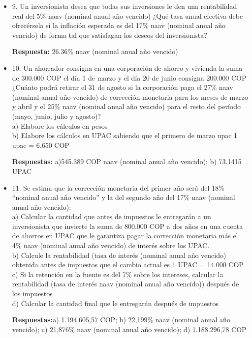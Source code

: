 \begin{itemize}
 \item 9. Un inversionista desea que todas sus inversiones le den una rentabilidad real del 5\% naav (nominal anual año vencido) ¿Qué  tasa anual efectiva debe ofrecérsela si la inflación esperada es del 17\% naav (nominal anual año vencido) de forma tal que satisfagan  los deseos del inversionista?
 
       \textbf{Respuesta:} 26.36\% naav (nominal anual año vencido)\\
       \medskip

 \item 10. Un ahorrador consigna en una corporación de ahorro y vivienda la suma de 300.000 COP el día 1 de  marzo y el día 20 de junio consigna  200.000  COP ¿Cuánto  podrá  retirar  el  31  de  agosto  si la corporación  paga el  27\% naav (nominal anual año vencido) de corrección monetaria para los meses de marzo y abril y el 25\% naav (nominal anual año vencido)  para el resto del período (mayo, junio, julio y agosto)?\\
       a) Elabore los cálculos en pesos\\
       b) Elabore los cálculos en UPAC sabiendo que el primero de marzo upac 1 upac = 6.650 COP
       
       \textbf{Respuestas:} a)545.389 COP naav (nominal anual año vencido); b) 73.1415 UPAC\\
       \medskip

 \item 11. Se estima que la corrección monetaria del primer año será del 18\% “nominal anual año vencido” y la del segundo año del 17\% naav (nominal anual año vencido):\\
       a) Calcular la cantidad que antes de impuestos le entregarán a un inversionista que invierte la suma de 800.000 COP  a dos años en una cuenta de ahorros en UPAC que le garantiza pagar la corrección monetaria más el 4\% naav (nominal anual año vencido) de interés sobre los UPAC.\\
       b) Calcule la rentabilidad (tasa de interés (nominal anual año vencido) obtenida antes de impuestos que el cambio actual es 1 UPAC = 14.000 COP\\
       c) Si la retención en la fuente es del 7\% sobre los intereses, calcular la rentabilidad (tasa de interés naav (nominal anual año vencido)) después de los impuestos\\
       d) Calcular la cantidad final que le entregarán después de impuestos
       
       \textbf{Respuestas:}a) 1.194.605,57 COP;  b) 22,199\% naav (nominal anual año vencido); c) 21,876\% naav (nominal anual año vencido); d) 1.188.296,78 COP\\
       \medskip


\end{itemize}
